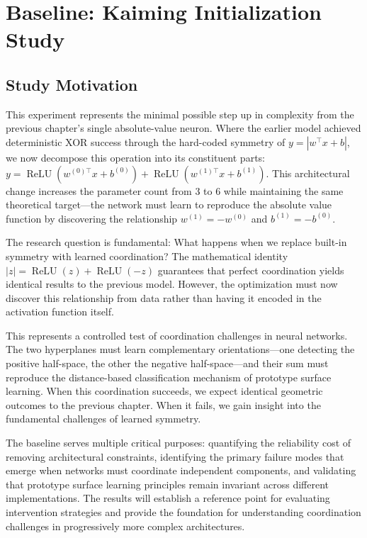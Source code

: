 
\section{Baseline: Kaiming Initialization Study}
\label{sec:relu1-kaiming}


\subsection*{Study Motivation}

This experiment represents the minimal possible step up in complexity from the previous chapter's single absolute-value neuron. Where the earlier model achieved deterministic XOR success through the hard-coded symmetry of $y = |w^{\top}x + b|$, we now decompose this operation into its constituent parts: $y = \operatorname{ReLU}(w^{(0)\top}x + b^{(0)}) + \operatorname{ReLU}(w^{(1)\top}x + b^{(1)})$. This architectural change increases the parameter count from 3 to 6 while maintaining the same theoretical target—the network must learn to reproduce the absolute value function by discovering the relationship $w^{(1)} = -w^{(0)}$ and $b^{(1)} = -b^{(0)}$.

The research question is fundamental: What happens when we replace built-in symmetry with learned coordination? The mathematical identity $|z| = \operatorname{ReLU}(z) + \operatorname{ReLU}(-z)$ guarantees that perfect coordination yields identical results to the previous model. However, the optimization must now discover this relationship from data rather than having it encoded in the activation function itself.

This represents a controlled test of coordination challenges in neural networks. The two hyperplanes must learn complementary orientations—one detecting the positive half-space, the other the negative half-space—and their sum must reproduce the distance-based classification mechanism of prototype surface learning. When this coordination succeeds, we expect identical geometric outcomes to the previous chapter. When it fails, we gain insight into the fundamental challenges of learned symmetry.

The baseline serves multiple critical purposes: quantifying the reliability cost of removing architectural constraints, identifying the primary failure modes that emerge when networks must coordinate independent components, and validating that prototype surface learning principles remain invariant across different implementations. The results will establish a reference point for evaluating intervention strategies and provide the foundation for understanding coordination challenges in progressively more complex architectures.

